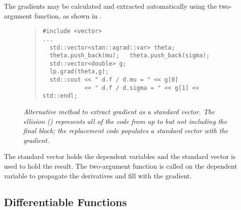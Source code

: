 \documentclass[10pt]{article}
\begin{document}
The gradients may be calculated and extracted automatically using the
two-argument  function, as shown in
.
%
\begin{figure}
\begin{quote}\small
\begin{Verbatim}
#include <vector>
...
  std::vector<stan::agrad::var> theta;
  theta.push_back(mu);   theta.push_back(sigma);
  std::vector<double> g;
  lp.grad(theta,g);
  std::cout << " d.f / d.mu = " << g[0]
            << " d.f / d.sigma = " << g[1] << std::endl;
\end{Verbatim}
\end{quote}
\caption{\small\it Alternative method to extract gradient as a
  standard vector.  The ellision () represents all of the
  code from  up to but not
  including the final block; the replacement code populates a standard
  vector with the gradient.}\label{normal-log-gradient-cpp-2.figure}
\end{figure}
%
The standard vector  holds the dependent variables and the
standard vector  is used to hold the result.  The two-argument
 function is called on the dependent variable to propagate
the derivatives and fill  with the gradient.

\subsection{Differentiable Functions}
\end{document}
